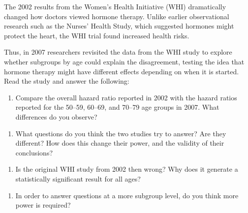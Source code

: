 \documentclass[
  letterpaper,
  DIV=11,
  numbers=noendperiod]{scrartcl}
\providecommand{\tightlist}{%
  \setlength{\itemsep}{0pt}\setlength{\parskip}{0pt}}
\begin{document}
\hfill\break
The 2002 results from the Women's Health Initiative (WHI) dramatically
changed how doctors viewed hormone therapy. Unlike earlier observational
research such as the Nurses' Health Study, which suggested hormones
might protect the heart, the WHI trial found increased health risks.

Thus, in 2007 researchers revisited the data from the WHI study to
explore whether subgroups by age could explain the disagreement, testing
the idea that hormone therapy might have different effects depending on
when it is started. Read the study and answer the following:

\begin{enumerate}
\def\labelenumi{\arabic{enumi}.}
\setcounter{enumi}{5}
\tightlist
\item
  Compare the overall hazard ratio reported in 2002 with the hazard
  ratios reported for the 50--59, 60--69, and 70--79 age groups in 2007.
  What differences do you observe?
\end{enumerate}

\hfill\break
\hfill\break
\hfill\break
\hfill\break
\hfill\break
\hfill\break
\hfill\break
\hfill\break

\begin{enumerate}
\def\labelenumi{\arabic{enumi}.}
\setcounter{enumi}{6}
\tightlist
\item
  What questions do you think the two studies try to answer? Are they
  different? How does this change their power, and the validity of their
  conclusions?
\end{enumerate}

\hfill\break
\hfill\break
\hfill\break
\hfill\break
\hfill\break
\hfill\break
\hfill\break

\begin{enumerate}
\def\labelenumi{\arabic{enumi}.}
\setcounter{enumi}{7}
\tightlist
\item
  Is the original WHI study from 2002 then wrong? Why does it generate a
  statistically significant result for all ages?
\end{enumerate}

\hfill\break
\hfill\break
\hfill\break
\hfill\break
\hfill\break
\hfill\break
\hfill\break
\hfill\break

\begin{enumerate}
\def\labelenumi{\arabic{enumi}.}
\setcounter{enumi}{8}
\tightlist
\item
  In order to answer questions at a more subgroup level, do you think
  more power is required?
\end{enumerate}
\end{document}
